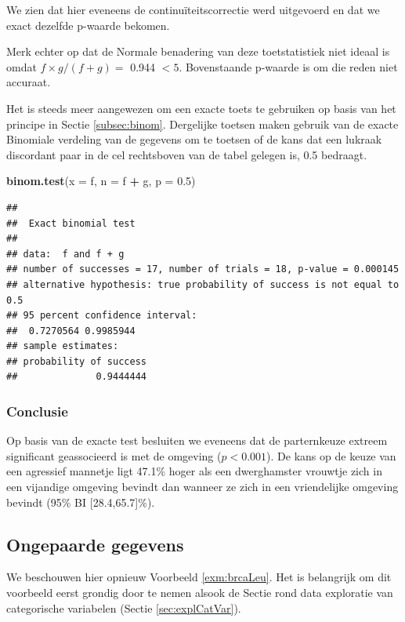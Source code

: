 \documentclass[
  12pt,dutch]{book}
\newenvironment{Shaded}{\begin{snugshade}}{\end{snugshade}}
\newcommand{\AttributeTok}[1]{\textcolor[rgb]{0.13,0.29,0.53}{#1}}
\newcommand{\FloatTok}[1]{\textcolor[rgb]{0.00,0.00,0.81}{#1}}
\newcommand{\FunctionTok}[1]{\textcolor[rgb]{0.13,0.29,0.53}{\textbf{#1}}}
\newcommand{\NormalTok}[1]{#1}
\newcommand{\SpecialCharTok}[1]{\textcolor[rgb]{0.81,0.36,0.00}{\textbf{#1}}}
\theoremstyle{definition}
\theoremstyle{definition}
\theoremstyle{definition}
\theoremstyle{definition}
\theoremstyle{remark}
\begin{document}
We zien dat hier eveneens de continuïteitscorrectie werd uitgevoerd en dat we exact dezelfde p-waarde bekomen.

Merk echter op dat de Normale benadering van deze toetstatistiek niet ideaal
is omdat \(f \times g/(f+g)=\) 0.944 \(<5\).
Bovenstaande p-waarde is om die reden niet accuraat.

Het is steeds meer aangewezen om een exacte toets te gebruiken op
basis van het principe in Sectie \ref{subsec:binom}.
Dergelijke toetsen maken
gebruik van de exacte Binomiale verdeling van de gegevens om te toetsen of
de kans dat een lukraak discordant paar in de cel rechtsboven van de tabel
gelegen is, 0.5 bedraagt.

\begin{Shaded}
\begin{Highlighting}[]
\FunctionTok{binom.test}\NormalTok{(}\AttributeTok{x =}\NormalTok{ f, }\AttributeTok{n =}\NormalTok{ f }\SpecialCharTok{+}\NormalTok{ g, }\AttributeTok{p =} \FloatTok{0.5}\NormalTok{)}
\end{Highlighting}
\end{Shaded}

\begin{verbatim}
## 
##  Exact binomial test
## 
## data:  f and f + g
## number of successes = 17, number of trials = 18, p-value = 0.000145
## alternative hypothesis: true probability of success is not equal to 0.5
## 95 percent confidence interval:
##  0.7270564 0.9985944
## sample estimates:
## probability of success 
##              0.9444444
\end{verbatim}

\subsubsection{Conclusie}\label{conclusie-1}

Op basis van de exacte test besluiten we eveneens dat de parternkeuze extreem significant geassocieerd is met de omgeving (\(p<0.001\)).
De kans op de keuze van een agressief mannetje ligt 47.1\% hoger als een dwerghamster vrouwtje zich in een vijandige omgeving bevindt dan wanneer ze zich in een vriendelijke omgeving bevindt (95\% BI {[}28.4,65.7{]}\%).

\subsection{Ongepaarde gegevens}\label{subsec:catOnPaired}

We beschouwen hier opnieuw Voorbeeld \ref{exm:brcaLeu}.
Het is belangrijk om dit voorbeeld eerst grondig door te nemen alsook de Sectie rond data exploratie van categorische variabelen (Sectie \ref{sec:explCatVar}).
\end{document}

